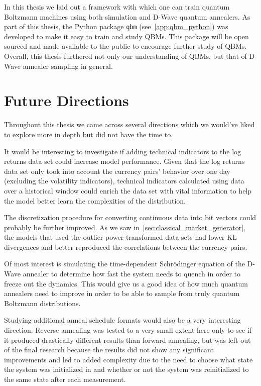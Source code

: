 In this thesis we laid out a framework with which one can train quantum Boltzmann machines using both simulation and D-Wave quantum annealers.
As part of this thesis, the Python package \texttt{qbm} (see~\cref{app:qbm_python}) was developed to make it easy to train and study QBMs.
This package will be open sourced and made available to the public to encourage further study of QBMs.
Overall, this thesis furthered not only our understanding of QBMs, but that of D-Wave annealer sampling in general.


\section{Future Directions}
Throughout this thesis we came across several directions which we would've liked to explore more in depth but did not have the time to.

It would be interesting to investigate if adding technical indicators to the log returns data set could increase model performance.
Given that the log returns data set only took into account the currency pairs' behavior over one day (excluding the volatility indicators), technical indicators calculated using data over a historical window could enrich the data set with vital information to help the model better learn the complexities of the distribution.

The discretization procedure for converting continuous data into bit vectors could probably be further improved.
As we saw in~\cref{sec:classical_market_generator}, the models that used the outlier power-transformed data sets had lower KL divergences and better reproduced the correlations between the currency pairs.

Of most interest is simulating the time-dependent Schr\"odinger equation of the D-Wave annealer to determine how fast the system needs to quench in order to freeze out the dynamics.
This would give us a good idea of how much quantum annealers need to improve in order to be able to sample from truly quantum Boltzmann distributions.

Studying additional anneal schedule formats would also be a very interesting direction.
Reverse annealing was tested to a very small extent here only to see if it produced drastically different results than forward annealing, but was left out of the final research because the results did not show any significant improvements and led to added complexity due to the need to choose what state the system was initialized in and whether or not the system was reinitialized to the same state after each measurement.
